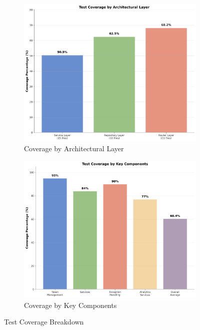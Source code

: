 \begin{figure}[htbp]
    \centering
    \begin{subfigure}[t]{0.48\textwidth}
        \centering
        \includegraphics[width=\textwidth]{figs/chapter5/coverage_by_layer.png}
        \caption{Coverage by Architectural Layer}
        \label{fig:coverage_by_layer}
    \end{subfigure}
    \hfill
    \begin{subfigure}[t]{0.48\textwidth}
        \centering
        \includegraphics[width=\textwidth]{figs/chapter5/coverage_by_component.png}
        \caption{Coverage by Key Components}
        \label{fig:coverage_by_component}
    \end{subfigure}
    \caption{Test Coverage Breakdown}
    \label{fig:coverage_breakdown}
\end{figure}

